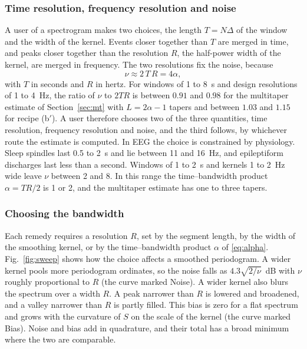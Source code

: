 \documentclass[10pt,twocolumn]{article}
\begin{document}
\subsubsection{Time resolution, frequency resolution and noise}
\label{sec:timefreq}
A user of a spectrogram makes two choices, the length $T=N\Delta$ of the window and the width of the kernel. Events closer together than $T$ are merged in time, and peaks closer together than the resolution $R$, the half-power width of the kernel, are merged in frequency. The two resolutions fix the noise, because
\begin{equation}
\nu\approx2\,T\,R=4\alpha,
\label{eq:design}
\end{equation}
with $T$ in seconds and $R$ in hertz. For windows of 1 to 8~s and design resolutions of 1 to 4~Hz, the ratio of $\nu$ to $2TR$ is between $0.91$ and $0.98$ for the multitaper estimate of Section~\ref{sec:mt} with $L=2\alpha-1$ tapers and between $1.03$ and $1.15$ for recipe (b$'$). A user therefore chooses two of the three quantities, time resolution, frequency resolution and noise, and the third follows, by whichever route the estimate is computed. In EEG the choice is constrained by physiology. Sleep spindles last 0.5 to 2~s and lie between 11 and 16~Hz, and epileptiform discharges last less than a second. Windows of 1 to 2~s and kernels 1 to 2~Hz wide leave $\nu$ between 2 and 8. In this range the time--bandwidth product $\alpha=TR/2$ is 1 or 2, and the multitaper estimate has one to three tapers.

\subsubsection{Choosing the bandwidth}
\label{sec:howwide}
Each remedy requires a resolution $R$, set by the segment length, by the width of the smoothing kernel, or by the time--bandwidth product $\alpha$ of \eqref{eq:alpha}. Fig.~\ref{fig:sweep} shows how the choice affects a smoothed periodogram. A wider kernel pools more periodogram ordinates, so the noise falls as $4.3\sqrt{2/\nu}$~dB with $\nu$ roughly proportional to $R$ (the curve marked Noise). A wider kernel also blurs the spectrum over a width $R$. A peak narrower than $R$ is lowered and broadened, and a valley narrower than $R$ is partly filled. This bias is zero for a flat spectrum and grows with the curvature of $S$ on the scale of the kernel (the curve marked Bias). Noise and bias add in quadrature, and their total has a broad minimum where the two are comparable.
\end{document}
